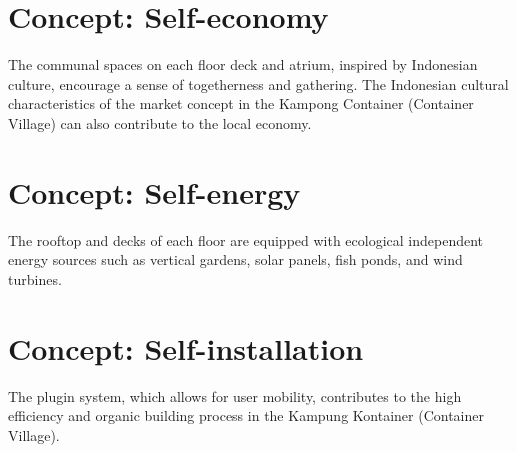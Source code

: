 \section*{
  Concept: Self-economy
 }

The communal spaces on each floor deck and atrium, inspired by Indonesian culture, encourage a sense of togetherness and gathering. The Indonesian cultural characteristics of the market concept in the Kampong Container (Container Village) can also contribute to the local economy.
\vfill
\begin{minipage}{\linewidth}
	\setlength{\MinipageGap}{0.5cm}
	\setlength{\MinipageAWidth}{\dimexpr ((0.55\linewidth) - (\MinipageGap))\relax}%
	\setlength{\MinipageBWidth}{\dimexpr (\linewidth - \MinipageAWidth - \MinipageGap)\relax}
	\begin{minipage}[t]{\MinipageAWidth}%
		
	\end{minipage}%
	\hspace{\MinipageGap}%
	\begin{minipage}[t]{\MinipageBWidth}%
		
	\end{minipage}%
\end{minipage}
\columnbreak%
\setlength{\columnsep}{0.25cm}%
\begin{multicols}{2}
	
	
\end{multicols}
\setlength{\columnsep}{0.25cm}%
\begin{multicols}{2}
	\section*{
	  Concept: Self-energy
	 }
	
	\vspace{-\baselineskip}%
	The rooftop and decks of each floor are equipped with ecological independent energy sources such as vertical gardens, solar panels, fish ponds, and wind turbines.
	\columnbreak%
	\section*{
	  Concept: Self-installation
	 }
	
	\vspace{-\baselineskip}%
	The plugin system, which allows for user mobility, contributes to the high efficiency and organic building process in the Kampung Kontainer (Container Village).
\end{multicols}
\EndTwoColumnLayout
